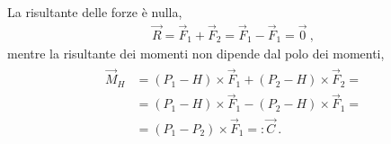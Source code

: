 \documentclass[letterpaper,10pt,italian]{jupyterBook}
\begin{document}
\sphinxAtStartPar
La risultante delle forze è nulla,
\begin{equation*}
\begin{split}\vec{R} = \vec{F}_1 + \vec{F}_2 = \vec{F}_1 - \vec{F}_1 = \vec{0} \ ,\end{split}
\end{equation*}
\sphinxAtStartPar
mentre la risultante dei momenti non dipende dal polo dei momenti,
\begin{equation*}
\begin{split}\begin{aligned}
  \vec{M}_H & = (P_1 - H) \times \vec{F}_1 + (P_2 - H) \times \vec{F}_2 = \\
  & = (P_1 - H) \times \vec{F}_1 - (P_2 - H) \times \vec{F}_1 = \\
  & = (P_1 - P_2) \times \vec{F}_1 =: \vec{C} \ .
\end{aligned}\end{split}
\end{equation*}
\end{document}

